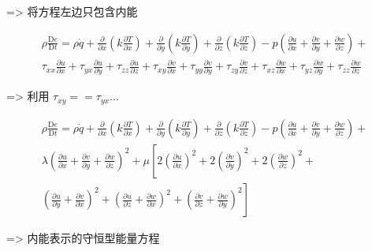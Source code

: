 \documentclass[UTF8]{ctexart}
\begin{document}
=> 将方程左边只包含内能

$$
	\begin{gathered}
		\rho \frac{\mathrm{D} e}{\mathrm{D} t}=\rho \dot{q}+\frac{\partial}{\partial x}\left(k \frac{\partial T}{\partial x}\right)+\frac{\partial}{\partial y}\left(k \frac{\partial T}{\partial y}\right)+\frac{\partial}{\partial z}\left(k \frac{\partial T}{\partial z}\right)-p\left(\frac{\partial u}{\partial x}+\frac{\partial v}{\partial y}+\frac{\partial w}{\partial z}\right)+ \\
		\tau_{x x} \frac{\partial u}{\partial x}+\tau_{y x} \frac{\partial u}{\partial y}+\tau_{z z} \frac{\partial u}{\partial z}+\tau_{x y} \frac{\partial v}{\partial x}+\tau_{y y} \frac{\partial v}{\partial y}+\tau_{z y} \frac{\partial v}{\partial z}+\tau_{x z} \frac{\partial w}{\partial x}+\tau_{y z} \frac{\partial w}{\partial y}+\tau_{z z} \frac{\partial w}{\partial z}
	\end{gathered}
$$

=> 利用 $\tau_{xy} == \tau_{yx} ...$


$$
	\begin{gathered}
		\rho \frac{\mathrm{D} e}{\mathrm{D} t}=\rho \dot{q}+\frac{\partial}{\partial x}\left(k \frac{\partial T}{\partial x}\right)+\frac{\partial}{\partial y}\left(k \frac{\partial T}{\partial y}\right)+\frac{\partial}{\partial z}\left(k \frac{\partial T}{\partial z}\right)-p\left(\frac{\partial u}{\partial x}+\frac{\partial v}{\partial y}+\frac{\partial w}{\partial z}\right)+ \\
		\lambda\left(\frac{\partial u}{\partial x}+\frac{\partial v}{\partial y}+\frac{\partial w}{\partial z}\right)^{2}+\mu\left[2\left(\frac{\partial u}{\partial x}\right)^{2}+2\left(\frac{\partial v}{\partial y}\right)^{2}+2\left(\frac{\partial w}{\partial z}\right)^{2}+\right. \\
			\left.\left(\frac{\partial u}{\partial y}+\frac{\partial v}{\partial x}\right)^{2}+\left(\frac{\partial u}{\partial z}+\frac{\partial w}{\partial x}\right)^{2}+\left(\frac{\partial v}{\partial z}+\frac{\partial w}{\partial y}\right)^{2}\right]
	\end{gathered}
$$


=> 内能表示的守恒型能量方程
\end{document}
